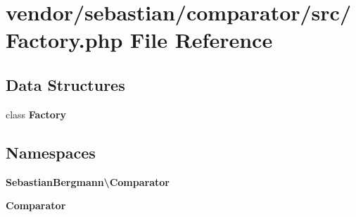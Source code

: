 \section{vendor/sebastian/comparator/src/\+Factory.php File Reference}
\label{sebastian_2comparator_2src_2_factory_8php}
\subsection*{Data Structures}
\begin{DoxyCompactItemize}
\item 
class {\bf Factory}
\end{DoxyCompactItemize}
\subsection*{Namespaces}
\begin{DoxyCompactItemize}
\item 
 {\bf Sebastian\+Bergmann\textbackslash{}\+Comparator}
\item 
 {\bf Comparator}
\end{DoxyCompactItemize}
